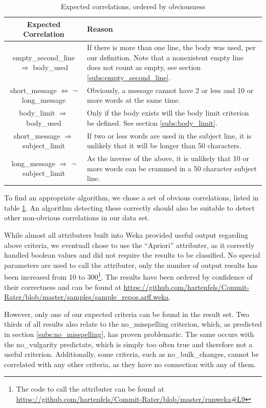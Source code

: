 \begin{table}[t]
    \begin{tabularx}{\textwidth}{|c|X|}\hline
        \textbf{Expected Correlation} & \textbf{Reason} \\\hline
        empty\_second\_line $\Rightarrow$ body\_used & If there is more than one line, the body was used, per our definition. Note that a nonexistent empty line does not count as empty, see section \ref{subs:empty_second_line}.\\\hline
        short\_message $\Leftrightarrow$ $\neg$ long\_message & Obviously, a message cannot have 2 or less and 10 or more words at the same time. \\\hline
        body\_limit $\Rightarrow$ body\_used & Only if the body exists will the body limit criterion be defined. See section \ref{subs:body_limit}. \\\hline
        short\_message $\Rightarrow$ subject\_limit & If two or less words are used in the subject line, it is unlikely that it will be longer than 50 characters. \\\hline
        long\_message $\Rightarrow$ $\neg$ subject\_limit & As the inverse of the above, it is unlikely that 10 or more words can be crammed in a 50 character subject line. \\\hline
    \end{tabularx}
    \caption{Expected correlations, ordered by obviousness}
    \label{tab:expect}
\end{table}

To find an appropriate algorithm, we chose a set of obvious correlations, listed in table \ref{tab:expect}. An algorithm detecting these correctly should also be suitable to detect other non-obvious correlations in our data set.

While almost all attributers built into Weka provided useful output regarding above criteria, we eventuall chose to use the ``Apriori'' attributer\cite{FastWeka,ClassWeka}, as it correctly handled boolean values and did not require the results to be classified. No special parameters are used to call the attributer, only the number of output results has been increased from 10 to 300\footnote{The code to call the attributer can be found at \url{https://github.com/hartenfels/Commit-Rater/blob/master/runweka\#L9}}. The results have been ordered by confidence of their correctness and can be found at \url{https://github.com/hartenfels/Commit-Rater/blob/master/samples/sample\_repos.arff.weka}.

However, only one of our expected criteria can be found in the result set. Two thirds of all results also relate to the no\_misspelling criterion, which, as predicted in section \ref{subs:no_misspelling}, has proven problematic. The same occurs with the no\_vulgarity predictate, which is simply too often true and therefore not a useful criterion. Additionally, some criteria, such as no\_bulk\_changes, cannot be correlated with any other criteria, as they have no connection with any of them.

